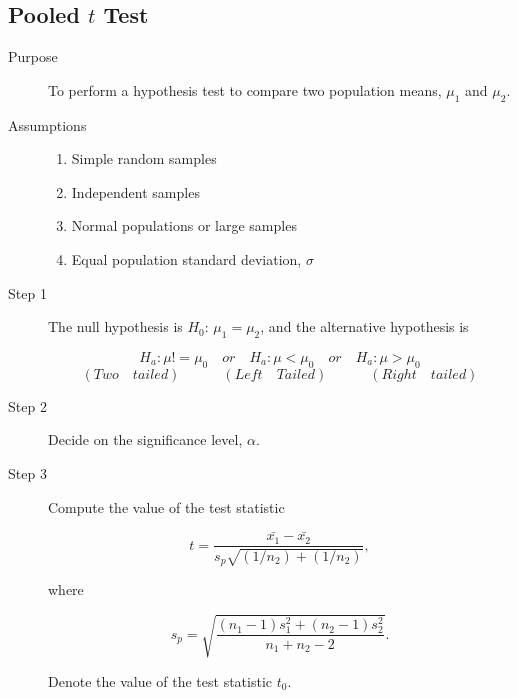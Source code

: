\documentclass[12pt]{article}
\begin{document}
            \subsection*{Pooled $t$ Test}
                \begin{description}
                    \item[Purpose] To perform a hypothesis test to compare two population
                    means, $\mu_1$ and $\mu_2$.
                    \item[Assumptions] 
                    \begin{enumerate}
                        \item Simple random samples
                        \item Independent samples
                        \item Normal populations or large samples
                        \item Equal population standard deviation, $\sigma$
                    \end{enumerate}
                    \item[Step 1] The null hypothesis is $H_0$: $\mu_1 = \mu_2$, and the
                    alternative hypothesis is
                    \begin{center}
                        \[
                            H_a: \mu != \mu_0 \quad or \quad H_a: \mu < \mu_0 \quad or \quad 
                            H_a: \mu > \mu_0    
                        \]
                        \[
                            (Two \quad tailed)\quad\quad\quad(Left \quad Tailed)\quad\quad\quad
                            (Right \quad tailed)    
                        \]                    
                    \end{center}
                    \item[Step 2] Decide on the significance level, $\alpha$.
                    \item[Step 3] Compute the value of the test statistic
                    \begin{center}
                        \[
                            t = \frac{\bar{x_1} - \bar{x_2}}{s_p\sqrt{(1/n_2) + (1/n_2)}}, 
                        \]
                    \end{center}
                    where
                    \begin{center}
                       \[
                            s_p = \sqrt{\frac{(n_1 - 1)s_1^2 + (n_2 -1)s_2^2}{n_1 + n_2 - 2}}.
                       \]    
                    \end{center}
                    Denote the value of the test statistic $t_0$.
                \end{description}
\end{document}
